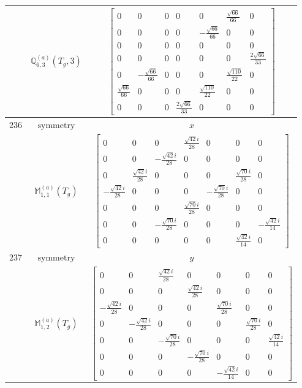 \documentclass[fleqn,8pt,landscape]{jsarticle}
\begin{document}
\begin{longtable}{ccc}
$  $ & $ \mathbb{Q}_{6,3}^{(a)}(T_{g},3) $ & $ \begin{bmatrix} 0 & 0 & 0 & 0 & 0 & \frac{\sqrt{66}}{66} & 0 \\ 0 & 0 & 0 & 0 & - \frac{\sqrt{66}}{66} & 0 & 0 \\ 0 & 0 & 0 & 0 & 0 & 0 & 0 \\ 0 & 0 & 0 & 0 & 0 & 0 & \frac{2 \sqrt{66}}{33} \\ 0 & - \frac{\sqrt{66}}{66} & 0 & 0 & 0 & \frac{\sqrt{110}}{22} & 0 \\ \frac{\sqrt{66}}{66} & 0 & 0 & 0 & \frac{\sqrt{110}}{22} & 0 & 0 \\ 0 & 0 & 0 & \frac{2 \sqrt{66}}{33} & 0 & 0 & 0 \end{bmatrix} $ \\ \hline
$ 236 $ & $ \text{symmetry} $ & $ x $ \\
$  $ & $ \mathbb{M}_{1,1}^{(a)}(T_{g}) $ & $ \begin{bmatrix} 0 & 0 & 0 & \frac{\sqrt{42} i}{28} & 0 & 0 & 0 \\ 0 & 0 & - \frac{\sqrt{42} i}{28} & 0 & 0 & 0 & 0 \\ 0 & \frac{\sqrt{42} i}{28} & 0 & 0 & 0 & \frac{\sqrt{70} i}{28} & 0 \\ - \frac{\sqrt{42} i}{28} & 0 & 0 & 0 & - \frac{\sqrt{70} i}{28} & 0 & 0 \\ 0 & 0 & 0 & \frac{\sqrt{70} i}{28} & 0 & 0 & 0 \\ 0 & 0 & - \frac{\sqrt{70} i}{28} & 0 & 0 & 0 & - \frac{\sqrt{42} i}{14} \\ 0 & 0 & 0 & 0 & 0 & \frac{\sqrt{42} i}{14} & 0 \end{bmatrix} $ \\ \hline
$ 237 $ & $ \text{symmetry} $ & $ y $ \\
$  $ & $ \mathbb{M}_{1,2}^{(a)}(T_{g}) $ & $ \begin{bmatrix} 0 & 0 & \frac{\sqrt{42} i}{28} & 0 & 0 & 0 & 0 \\ 0 & 0 & 0 & \frac{\sqrt{42} i}{28} & 0 & 0 & 0 \\ - \frac{\sqrt{42} i}{28} & 0 & 0 & 0 & \frac{\sqrt{70} i}{28} & 0 & 0 \\ 0 & - \frac{\sqrt{42} i}{28} & 0 & 0 & 0 & \frac{\sqrt{70} i}{28} & 0 \\ 0 & 0 & - \frac{\sqrt{70} i}{28} & 0 & 0 & 0 & \frac{\sqrt{42} i}{14} \\ 0 & 0 & 0 & - \frac{\sqrt{70} i}{28} & 0 & 0 & 0 \\ 0 & 0 & 0 & 0 & - \frac{\sqrt{42} i}{14} & 0 & 0 \end{bmatrix} $ \\ \hline

\end{longtable}
\end{document}
